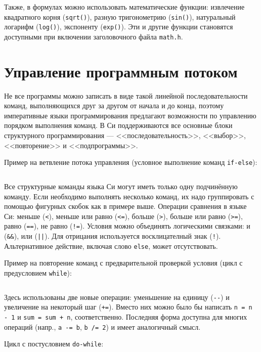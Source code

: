 Также, в формулах можно использовать математические функции: извлечение
квадратного корня (\texttt{sqrt()}), разную тригонометрию (\texttt{sin()}),
натуральный логарифм (\texttt{log()}), экспоненту (\texttt{exp()}). Эти и
другие функции становятся доступными при включении заголовочного файла
\texttt{math.h}.


\section{Управление программным потоком}

Не все программы можно записать в виде такой линейной последовательности
команд, выполняющихся друг за другом от начала и до конца, поэтому
императивные языки программирования предлагают возможности по управлению
порядком выполнения команд. В Си поддерживаются все основные блоки
структурного программирования --- <<последовательность>>, <<выбор>>,
<<повторение>> и <<подпрограммы>>.

\zzneedspace
Пример на ветвление потока управления (условное выполнение команд \texttt{if-else}):
%
\inputminted{c}{samples/01_if.c}

Все структурные команды языка Си могут иметь только одну подчинённую команду.
Если необходимо выполнять несколько команд, их надо группировать с помощью
фигурных скобок как в примере выше. Операции сравнения в языке Си: меньше
(\verb|<|), меньше или равно (\verb|<=|), больше (\verb|>|), больше или равно
(\verb|>=|), равно (\verb|==|), не равно (\verb|!=|). Условия можно объединять
логическими связками: и (\verb|&&|), или (\verb/||/). Для отрицания
используется восклицателный знак (\verb|!|). Альтернативное действие,
включая слово \texttt{else}, может отсутствовать.

\zzneedspace
Пример на повторение команд с предварительной проверкой условия (цикл с
предусловием \texttt{while}):
%
\inputminted{c}{samples/02_while.c}

Здесь использованы две новые операции: уменьшение на единицу (\verb|--|) и
увеличение на некоторый шаг (\verb|+=|). Вместо них можно было бы написать
\verb|n = n - 1| и \verb|sum = sum + n|, соответственно. Последняя форма доступна для многих
операций (напр., \verb|a -= b|, \verb|b /= 2|) и имеет аналогичный смысл.

\zzneedspace
Цикл с постусловием \texttt{do-while}:
%
\inputminted{c}{samples/03_do_while.c}

